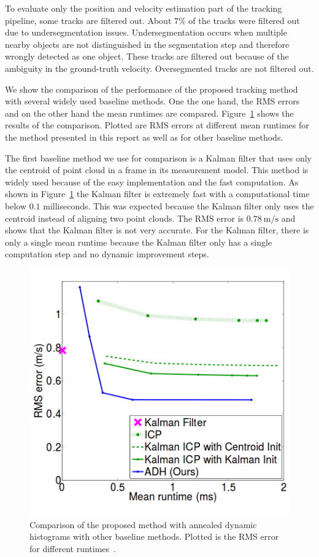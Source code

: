 \documentclass[twoside,a4paper,article]{combine}
\begin{document}
To evaluate only the position and velocity estimation part of the
tracking pipeline, some tracks are filtered out. About $7\%$ of the tracks
were filtered out due to undersegmentation issues. Undersegmentation
occurs when multiple nearby objects are not distinguished in the
segmentation step and therefore wrongly detected as one object. These
tracks are filtered out because of the ambiguity in the ground-truth
velocity. Oversegmented tracks are not filtered out.

We show the comparison of the performance of the proposed tracking method with
several widely used baseline methods. One the one hand, the
RMS errors and on the other hand the mean runtimes are compared.
Figure~\ref{fig:rms-runtime} shows the results of the
comparison. Plotted are RMS errors at different mean runtimes for the
method presented in this report as well as for other baseline methods.

The first baseline method we use for comparison is a Kalman filter that
uses only the centroid of point cloud in a frame in its measurement
model. This method is widely used because of the easy implementation
and the fast computation. As shown in Figure~\ref{fig:rms-runtime} the
Kalman filter is extremely fast with a computational time below $0.1$
milliseconds. This was expected because the Kalman filter only uses
the centroid instead of aligning two point clouds. The RMS error is
$0.78 \mathrm{~m/s}$ and shows that the Kalman filter is not very
accurate. For the Kalman filter, there is only a single mean runtime
because the Kalman filter only has a single computation step and no
dynamic improvement steps.

\begin{figure}
  \center
  \includegraphics[width=.45\linewidth]{rms-vs-runtime}
  \caption{Comparison of the proposed method with annealed dynamic
    histograms with other baseline methods. Plotted is the RMS error
    for different runtimes~\cite{paper}.}
  \label{fig:rms-runtime}
\end{figure}
\end{document}
